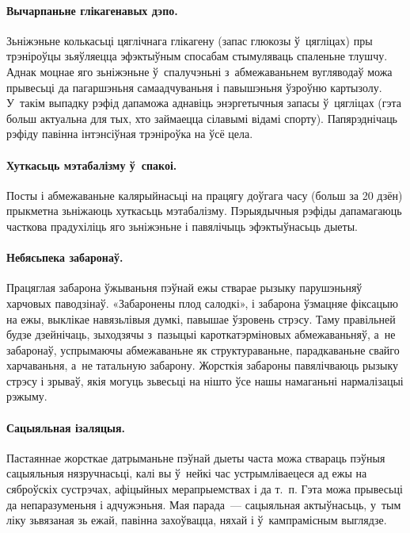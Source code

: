 \paragraph{Вычарпаньне глікагенавых дэпо.}
Зьніжэньне колькасьці цяглічнага глікагену (запас глюкозы ў~цягліцах) пры трэніроўцы зьяўляецца эфэктыўным спосабам стымуляваць спаленьне тлушчу. Аднак моцнае яго зьніжэньне ў~спалучэньні з~абмежаваньнем вугляводаў можа прывесьці да пагаршэньня самаадчуваньня і павышэньня ўзроўню картызолу. У~такім выпадку рэфід дапаможа аднавіць энэргетычныя запасы ў~цягліцах (гэта больш актуальна для тых, хто займаецца сілавымі відамі спорту). Папярэднічаць рэфіду павінна інтэнсіўная трэніроўка на ўсё цела.

\paragraph{Хуткасьць мэтабалізму ў~спакоі.}
Посты і абмежаваньне калярыйнасьці на працягу доўгага часу (больш за 20 дзён) прыкметна зьніжаюць хуткасьць мэтабалізму. Пэрыядычныя рэфіды дапамагаюць часткова прадухіліць яго зьніжэньне і павялічыць эфэктыўнасьць дыеты.

\paragraph{Небясьпека забаронаў.}
Працяглая забарона ўжываньня пэўнай ежы стварае рызыку парушэньняў харчовых паводзінаў. «Забаронены плод салодкі», і забарона ўзмацняе фіксацыю на ежы, выклікае навязьлівыя думкі, павышае ўзровень стрэсу. Таму правільней будзе дзейнічаць, зыходзячы з~пазыцыі кароткатэрміновых абмежаваньняў, а~не забаронаў, успрымаючы абмежаваньне як структураваньне, парадкаваньне свайго харчаваньня, а~не татальную забарону. Жорсткія забароны павялічваюць рызыку стрэсу і зрываў, якія могуць зьвесьці на нішто ўсе нашы намаганьні нармалізацыі рэжыму.


\paragraph{Сацыяльная ізаляцыя.}
Пастаяннае жорсткае датрыманьне пэўнай дыеты часта можа ствараць пэўныя сацыяльныя нязручнасьці, калі вы ў~нейкі час устрымліваецеся ад ежы на сяброўскіх сустрэчах, афіцыйных мерапрыемствах і да т.~п. Гэта можа прывесьці да непаразуменьня і адчужэньня. Мая парада~--- сацыяльная актыўнасьць, у~тым ліку зьвязаная зь ежай, павінна захоўвацца, няхай і ў~кампрамісным выглядзе.

